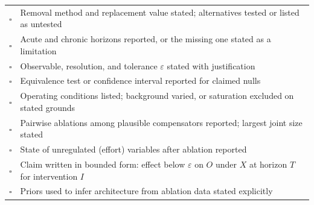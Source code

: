 \documentclass[11pt]{article}
\theoremstyle{definition}
\theoremstyle{remark}
\begin{document}
\begin{center}
\small
\begin{tabular}{p{0.3cm}p{11cm}}
\toprule
$\square$ & Removal method and replacement value stated; alternatives tested or listed as untested\\
$\square$ & Acute and chronic horizons reported, or the missing one stated as a limitation\\
$\square$ & Observable, resolution, and tolerance $\varepsilon$ stated with justification\\
$\square$ & Equivalence test or confidence interval reported for claimed nulls\\
$\square$ & Operating conditions listed; background varied, or saturation excluded on stated grounds\\
$\square$ & Pairwise ablations among plausible compensators reported; largest joint size stated\\
$\square$ & State of unregulated (effort) variables after ablation reported\\
$\square$ & Claim written in bounded form: effect below $\varepsilon$ on $O$ under $X$ at horizon $T$ for intervention $I$\\
$\square$ & Priors used to infer architecture from ablation data stated explicitly\\
\bottomrule
\end{tabular}
\end{center}
\end{document}
